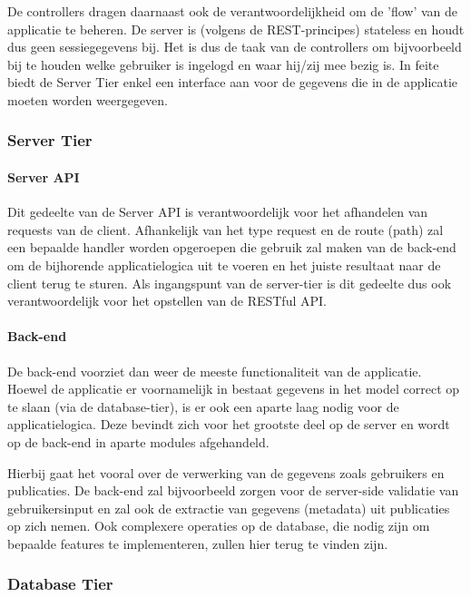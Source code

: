 \documentclass{article}
\begin{document}
De controllers dragen daarnaast ook de verantwoordelijkheid om de 'flow' van de applicatie te beheren. De server is (volgens de REST-principes) stateless en houdt dus geen sessiegegevens bij. Het is dus de taak van de controllers om bijvoorbeeld bij te houden welke gebruiker is ingelogd en waar hij/zij mee bezig is. In feite biedt de Server Tier enkel een interface aan voor de gegevens die in de applicatie moeten worden weergegeven.

\subsubsection{Server Tier}

\paragraph{Server API} 
Dit gedeelte van de Server API is verantwoordelijk voor het afhandelen van requests van de client. Afhankelijk van het type request en de route (path) zal een bepaalde handler worden opgeroepen die gebruik zal maken van de back-end om de bijhorende applicatielogica uit te voeren en het juiste resultaat naar de client terug te sturen. Als ingangspunt van de server-tier is dit gedeelte dus ook verantwoordelijk voor het opstellen van de RESTful API.

\paragraph{Back-end} 
De back-end voorziet dan weer de meeste functionaliteit van de applicatie. Hoewel de applicatie er voornamelijk in bestaat gegevens in het model correct op te slaan (via de database-tier), is er ook een aparte laag nodig voor de applicatielogica. Deze bevindt zich voor het grootste deel op de server en wordt op de back-end in aparte modules afgehandeld.

Hierbij gaat het vooral over de verwerking van de gegevens zoals gebruikers en publicaties. De back-end zal bijvoorbeeld zorgen voor de server-side validatie van gebruikersinput en zal ook de extractie van gegevens (metadata) uit publicaties op zich nemen. Ook complexere operaties op de database, die nodig zijn om bepaalde features te implementeren, zullen hier terug te vinden zijn.

\subsubsection{Database Tier}
\end{document}
